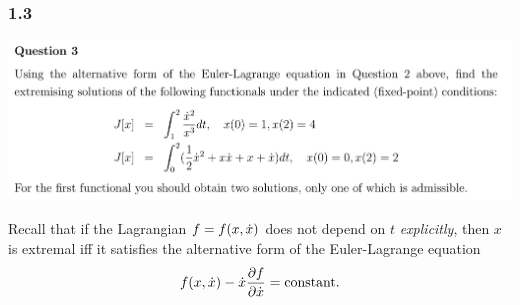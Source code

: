 \subsubsection{1.3}
\begin{mdframed}
  \includegraphics[width=400pt]{img/cov-haliakis-ooc-1-3.png}
\end{mdframed}

Recall that if the Lagrangian $f = f(x, \dot{x})$ does not depend on $t$ {\it explicitly}, then $x$ is extremal iff it satisfies the alternative form of the
Euler-Lagrange equation
\begin{align*}
    f(x, \dot{x}) - \dot{x}\frac{\partial f}{\partial \dot{x}} = \text{constant}.
\end{align*}
